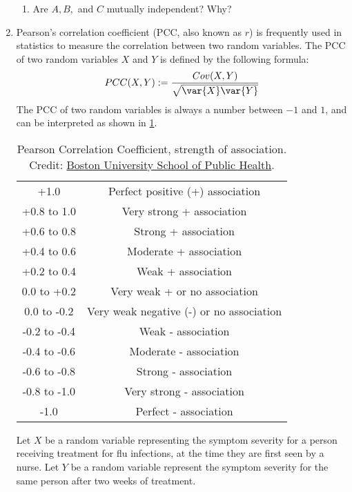 \documentclass{article}
\begin{document}
\begin{enumerate}
\begin{enumerate}
        \item Are $A, B,$ and $C$ mutually independent? Why?
    \end{enumerate}
    \item Pearson's correlation coefficient (PCC, also known as $r$) is frequently used in statistics to measure the correlation between two random variables.
    The PCC of two random variables $X$ and $Y$ is defined by the following formula:
    \begin{align*}
        PCC(X, Y) := \frac{Cov(X, Y)}{\sqrt{\var{X}\var{Y}}}
    \end{align*}
    The PCC of two random variables is always a number between $-1$ and $1$, and can be interpreted as shown in \cref{tbl:association}.
    \begin{table}
    \centering
    \begin{tabular}{|c|c|}
    \hline
         +1.0& 	Perfect positive (+) association \\
+0.8 to 1.0& 	Very strong + association\\
+0.6 to 0.8& 	Strong + association\\
+0.4 to 0.6& 	Moderate + association\\
+0.2 to 0.4& 	Weak + association\\
0.0 to +0.2& 	Very weak + or no association\\
0.0 to -0.2& 	Very weak negative (-) or no association\\
-0.2 to -0.4& 	Weak - association\\
-0.4 to -0.6& 	Moderate - association\\
-0.6 to -0.8& 	Strong - association\\
-0.8 to -1.0& 	Very strong - association\\
-1.0& 	Perfect - association \\
\hline
    \end{tabular}
    \caption{Pearson Correlation Coefficient, strength of association. Credit: \href{https://web.archive.org/web/20240324210249/https://sphweb.bumc.bu.edu/otlt/MPH-Modules/PH717-QuantCore/PH717-Module9-Correlation-Regression/PH717-Module9-Correlation-Regression4.html}{Boston University School of Public Health}.}
    \label{tbl:association}
    \end{table}
    
    Let $X$ be a random variable representing the symptom severity for a person receiving treatment for flu infections, at the time they are first seen by a nurse.
    Let $Y$ be a random variable represent the symptom severity for the same person after two weeks of treatment.


\end{enumerate}
\end{document}
